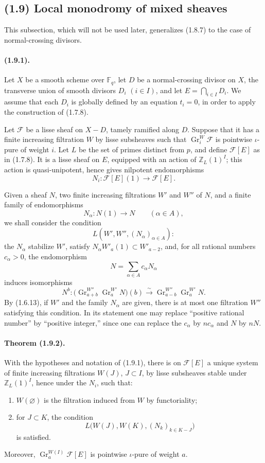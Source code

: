 \documentclass[11pt]{article}
\theoremstyle{remark}
\newcommand{\ZZ}{\mathbb{Z}}
\newcommand{\Fq}{\mathbb{F}_q}
\newcommand{\Gr}{\operatorname{Gr}}
\begin{document}
\subsection*{(1.9) Local monodromy of mixed sheaves}

This subsection, which will not be used later, generalizes (1.8.7) to the case of normal-crossing divisors.

\paragraph{(1.9.1).}
Let \(X\) be a smooth scheme over \(\Fq\), let \(D\) be a normal-crossing divisor on \(X\), the transverse union of smooth divisors \(D_i\) \((i\in I)\), and let \(E=\bigcap_{i\in I}D_i\). We assume that each \(D_i\) is globally defined by an equation \(t_i=0\), in order to apply the construction of (1.7.8).

Let \(\mathcal F\) be a lisse sheaf on \(X-D\), tamely ramified along \(D\). Suppose that it has a finite increasing filtration \(W\) by lisse subsheaves such that \(\Gr^W_i\mathcal F\) is pointwise \(\iota\)-pure of weight \(i\). Let \(L\) be the set of primes distinct from \(p\), and define \(\mathcal F[E]\) as in (1.7.8). It is a lisse sheaf on \(E\), equipped with an action of \(\ZZ_L(1)^I\); this action is quasi-unipotent, hence gives nilpotent endomorphisms
\[
N_i:\mathcal F[E](1)\longrightarrow \mathcal F[E].
\]

Given a sheaf \(N\), two finite increasing filtrations \(W'\) and \(W''\) of \(N\), and a finite family of endomorphisms
\[
N_\alpha:N(1)\longrightarrow N \qquad (\alpha\in A),
\]
we shall consider the condition
\[
L(W',W'',(N_\alpha)_{\alpha\in A}):
\]
the \(N_\alpha\) stabilize \(W'\), satisfy \(N_\alpha W'_a(1)\subset W'_{a-2}\), and, for all rational numbers \(c_\alpha>0\), the endomorphism
\[
N=\sum_{\alpha\in A}c_\alpha N_\alpha
\]
induces isomorphisms
\[
N^b:\bigl(\Gr^{W''}_{a+b}\Gr^{W'}_a N\bigr)(b)
   \xrightarrow{\sim}
   \Gr^{W''}_{a-b}\Gr^{W'}_a N .
\]
By (1.6.13), if \(W'\) and the family \(N_\alpha\) are given, there is at most one filtration \(W''\) satisfying this condition. In its statement one may replace ``positive rational number'' by ``positive integer,'' since one can replace the \(c_\alpha\) by \(n c_\alpha\) and \(N\) by \(nN\).

\paragraph{Theorem (1.9.2).}
With the hypotheses and notation of (1.9.1), there is on \(\mathcal F[E]\) a unique system of finite increasing filtrations \(W(J)\), \(J\subset I\), by lisse subsheaves stable under \(\ZZ_L(1)^I\), hence under the \(N_i\), such that:
\begin{enumerate}[label=\alph*)]
\item \(W(\varnothing)\) is the filtration induced from \(W\) by functoriality;
\item for \(J\subset K\), the condition
\[
L\bigl(W(J),W(K),(N_k)_{k\in K-J}\bigr)
\]
is satisfied.
\end{enumerate}
Moreover, \(\Gr^{W(I)}_a\mathcal F[E]\) is pointwise \(\iota\)-pure of weight \(a\).
\end{document}
